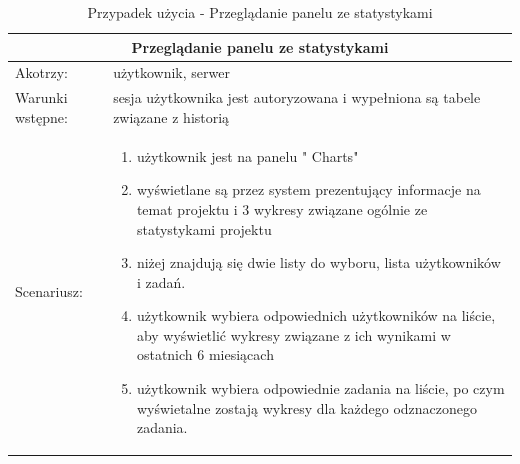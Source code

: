 \begin{table}[h!]
	\begin{tabular}{|p{2cm}||p{13cm}|  }
		


		\hline
		\multicolumn{2}{|c|}{Przeglądanie panelu ze statystykami} \\
		\hline
		Akotrzy: & użytkownik, serwer \\
		\hline
	   Warunki wstępne: & sesja użytkownika jest autoryzowana i wypełniona są tabele związane z historią \\
		\hline
		Scenariusz: &
		\begin{enumerate}
			\item użytkownik jest na panelu " Charts"
			\item wyświetlane są przez system prezentujący  informacje na temat projektu i 3 wykresy związane ogólnie ze statystykami projektu
			\item niżej znajdują się dwie listy do wyboru, lista użytkowników i zadań.
			\item użytkownik wybiera odpowiednich użytkowników na liście, aby wyświetlić wykresy związane z ich wynikami w ostatnich 6 miesiącach
			\item użytkownik wybiera odpowiednie zadania na liście, po czym wyświetalne zostają wykresy dla każdego odznaczonego zadania.
		\end{enumerate}\\
	\hline
	\end{tabular}
	\caption{Przypadek użycia - Przeglądanie panelu ze statystykami}
\end{table}


